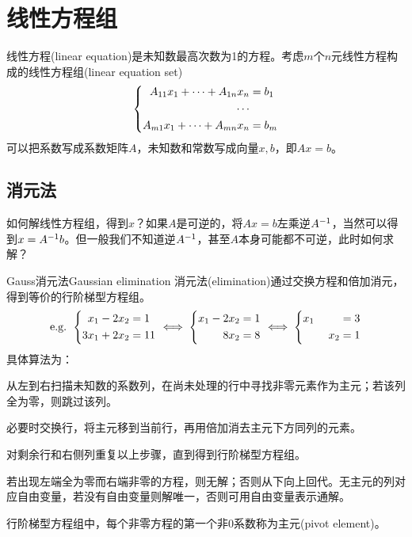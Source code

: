 \chapter{线性方程组}

线性方程(linear equation)是未知数最高次数为1的方程。考虑$m$个$n$元线性方程构成的线性方程组(linear equation set)
\[
	\left\{\begin{aligned}
		A_{11}x_1 + \cdots + A_{1n}x_n &= b_1\\
		\cdots&\\
		A_{m1}x_1 + \cdots + A_{mn}x_n &= b_m
	\end{aligned}\right.
\]
可以把系数写成系数矩阵$A$，未知数和常数写成向量$x,b$，即$Ax = b$。

\section{消元法}
\label{sec:elimination}

如何解线性方程组，得到$x$？如果$A$是可逆的，将$Ax = b$左乘逆$A^{-1}$，当然可以得到$x = A^{-1} b$。但一般我们不知道逆$A^{-1}$，甚至$A$本身可能都不可逆，此时如何求解？

\begin{theorem}{Gauss消元法}{Gaussian elimination}
	消元法(elimination)通过交换方程和倍加消元，得到等价的行阶梯型方程组。
	\[
		\text{e.g. }
		\left\{\begin{aligned}
			x_1 - 2x_2 &= 1\\3x_1 + 2x_2 &= 11
		\end{aligned}\right. \iff
		\left\{\begin{aligned}
			x_1 - 2x_2 &= 1\\8x_2 &= 8
		\end{aligned}\right. \iff
		\left\{\begin{aligned}
			x_1\phantom{-2x_2} &= 3\\x_2 &= 1
		\end{aligned}\right.
	\]
	具体算法为：
	\begin{compactenum}
		\item 从左到右扫描未知数的系数列，在尚未处理的行中寻找非零元素作为主元；若该列全为零，则跳过该列。
		\item 必要时交换行，将主元移到当前行，再用倍加消去主元下方同列的元素。
		\item 对剩余行和右侧列重复以上步骤，直到得到行阶梯型方程组。
		\item 若出现左端全为零而右端非零的方程，则无解；否则从下向上回代。无主元的列对应自由变量，若没有自由变量则解唯一，否则可用自由变量表示通解。
	\end{compactenum}
	行阶梯型方程组中，每个非零方程的第一个非0系数称为主元(pivot element)。
\end{theorem}

